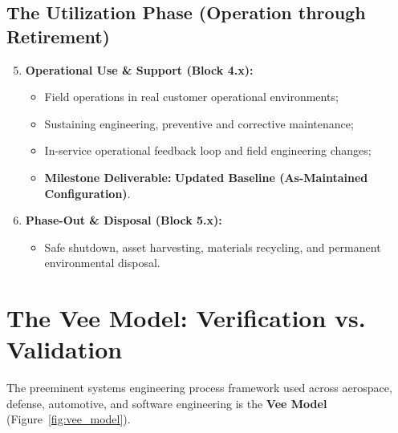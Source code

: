 \subsection{The Utilization Phase (Operation through Retirement)}
\begin{enumerate}[leftmargin=2em]
    \setcounter{enumi}{4}
    \item \textbf{Operational Use \& Support (Block 4.x):}
    \begin{itemize}
        \item Field operations in real customer operational environments;
        \item Sustaining engineering, preventive and corrective maintenance;
        \item In-service operational feedback loop and field engineering changes;
        \item \textbf{Milestone Deliverable:} \textbf{Updated Baseline (As-Maintained Configuration)}.
    \end{itemize}
    \item \textbf{Phase-Out \& Disposal (Block 5.x):}
    \begin{itemize}
        \item Safe shutdown, asset harvesting, materials recycling, and permanent environmental disposal.
    \end{itemize}
\end{enumerate}

\section{The Vee Model: Verification vs. Validation}
\label{sec:vee_model}

The preeminent systems engineering process framework used across aerospace, defense, automotive, and software engineering is the \textbf{Vee Model} (Figure~\ref{fig:vee_model}).

